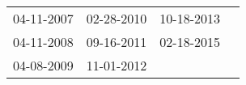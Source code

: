 \begin{supertabular}{llll}
 04-11-2007 &  02-28-2010 &  10-18-2013 \\
 04-11-2008 &  09-16-2011 &  02-18-2015 \\
 04-08-2009 &  11-01-2012 &             \\
\end{supertabular}
